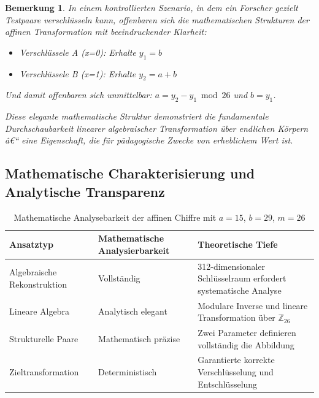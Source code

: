 ﻿\documentclass[12pt,a4paper]{article}
\newtheorem{remark}{Bemerkung}
\begin{document}
	\begin{remark}
		In einem kontrollierten Szenario, in dem ein Forscher gezielt Testpaare verschlüsseln kann, offenbaren sich die mathematischen Strukturen der affinen Transformation mit beeindruckender Klarheit:
		\begin{itemize}
			\item Verschlüssele A (x=0): Erhalte $y_1 = b$
			\item Verschlüssele B (x=1): Erhalte $y_2 = a + b$
		\end{itemize}
		
		Und damit offenbaren sich unmittelbar: $a = y_2 - y_1 \bmod 26$ und $b = y_1$.
		
		Diese elegante mathematische Struktur demonstriert die fundamentale Durchschaubarkeit linearer algebraischer Transformation über endlichen Körpern â€“ eine Eigenschaft, die für pädagogische Zwecke von erheblichem Wert ist.
	\end{remark}
	
	\subsection{Mathematische Charakterisierung und Analytische Transparenz}
	
	\begin{table}
		\caption{Mathematische Analysebarkeit der affinen Chiffre mit $a=15$, $b=29$, $m=26$}
		\begin{tabular}{|l|l|p{7cm}|}
			\hline
			\textbf{Ansatztyp} & \textbf{Mathematische Analysierbarkeit} & \textbf{Theoretische Tiefe} \\
			\hline\hline
			Algebraische Rekonstruktion & Vollständig & 312-dimensionaler Schlüsselraum erfordert systematische Analyse \\
			\hline
			Lineare Algebra & Analytisch elegant & Modulare Inverse und lineare Transformation über $\mathbb{Z}_{26}$ \\
			\hline
			Strukturelle Paare & Mathematisch präzise & Zwei Parameter definieren vollständig die Abbildung \\
			\hline
			Zieltransformation & Deterministisch & Garantierte korrekte Verschlüsselung und Entschlüsselung \\
			\hline
		\end{tabular}
	\end{table}
	
\end{document}
